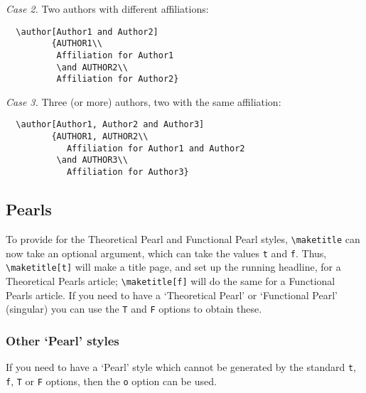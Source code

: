 \documentclass{jfp}
\begin{document}
\textit{Case 2.} Two authors with different affiliations:
%
\begin{verbatim}
  \author[Author1 and Author2]
         {AUTHOR1\\
          Affiliation for Author1
          \and AUTHOR2\\
          Affiliation for Author2}
\end{verbatim}

\textit{Case 3.} Three (or more) authors, two with the same affiliation:
%
\begin{verbatim}
  \author[Author1, Author2 and Author3]
         {AUTHOR1, AUTHOR2\\
            Affiliation for Author1 and Author2
          \and AUTHOR3\\
            Affiliation for Author3}
\end{verbatim}

\subsection{Pearls}

To provide for the Theoretical Pearl and Functional Pearl styles,
\verb"\maketitle" can now take an optional argument, which can take the
values \verb"t" and \verb"f". Thus, \verb"\maketitle[t]" will make a
title page, and set up the running headline, for a \linebreak Theoretical
Pearls article; \verb"\maketitle[f]" will do the same for a Functional Pearls
article.
If you need to have a `Theoretical Pearl' or `Functional Pearl' (singular)
you can use the \verb"T" and \verb"F" options to obtain these.

\subsubsection{Other `Pearl' styles}

If you need to have a `Pearl' style which cannot be generated by the
standard \verb"t", \verb"f", \verb"T" or \verb"F" options, then the \verb"o"
option can be used.
\end{document}
